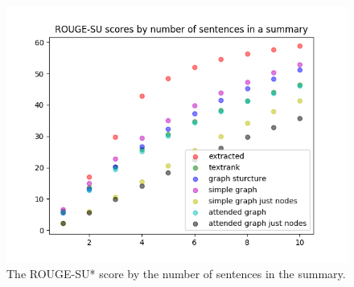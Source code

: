 \FloatBarrier

\begin{figure}[!ht]
	\centering
	\includegraphics[width=150mm, keepaspectratio]{figures/ROUGE_SU.png}
	\caption{The ROUGE-SU* score  by the number of sentences in the summary.}
	\label{fig:ROUGE-SU}
\end{figure}

